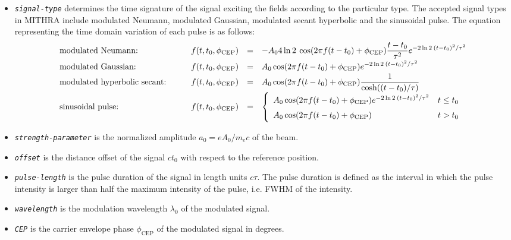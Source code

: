\begin{enumerate}
\begin{itemize}
	\item {\tt \small \em signal-type} determines the time signature of the signal exciting the fields according to the particular type. The accepted signal types in MITHRA include modulated Neumann, modulated Gaussian, modulated secant hyperbolic and the sinusoidal pulse. The equation representing the time domain variation of each pulse is as follows:
	\begin{equation}
	\label{signalTypes}
	\renewcommand{\arraystretch}{1.5}
	\begin{array}{lrcl}
	\mbox{modulated Neumann:}  \qquad & f(t,t_0,\phi_\mathrm{CEP}) & = & \displaystyle - A_0 4 \ln 2 \: \cos( 2 \pi f (t - t_0) + \phi_\mathrm{CEP} ) \frac{t - t_0}{\tau^2} e^{-2 \ln 2 \: (t - t_0)^2/\tau^2 } \\
	\mbox{modulated Gaussian:} \qquad & f(t,t_0,\phi_\mathrm{CEP}) & = & \displaystyle A_0 \cos( 2 \pi f (t - t_0) + \phi_\mathrm{CEP} ) e^{-2 \ln 2 \: (t - t_0)^2/\tau^2 } \\
	\mbox{modulated hyperbolic secant:} \qquad & f(t,t_0,\phi_\mathrm{CEP}) & = & \displaystyle A_0 \cos( 2 \pi f (t - t_0) + \phi_\mathrm{CEP} ) \frac{1}{\cosh ( (t - t_0)/\tau ) } \\
	\mbox{sinusoidal pulse:}   \qquad & f(t,t_0,\phi_\mathrm{CEP}) & = & \displaystyle \left\{ \begin{array}{ll} A_0 \cos( 2 \pi f (t - t_0) + \phi_\mathrm{CEP} ) e^{-2 \ln 2 \: (t - t_0)^2/\tau^2 } & t \leq t_0 \\ A_0 \cos( 2 \pi f (t - t_0) + \phi_\mathrm{CEP} ) & t > t_0 \end{array} \right.
	\end{array}
	\end{equation}
	\item {\tt \small \em strength-parameter} is the normalized amplitude $a_0 = e A_0 / m_ec $ of the beam.
	\item {\tt \small \em offset} is the distance offset of the signal $ct_0$ with respect to the reference position.
	\item {\tt \small \em pulse-length} is the pulse duration of the signal in length units $c\tau$. The pulse duration is defined as the interval in which the pulse intensity is larger than half the maximum intensity of the pulse, i.e. FWHM of the intensity.
	\item {\tt \small \em wavelength} is the modulation wavelength $\lambda_0$ of the modulated signal.
	\item {\tt \small \em CEP} is the carrier envelope phase $\phi_{\mathrm{CEP}}$ of the modulated signal in degrees.

\end{itemize}
\end{enumerate}
